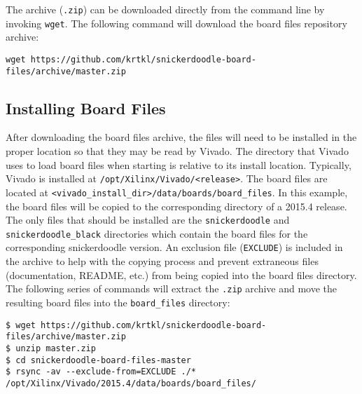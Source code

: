 \noindent
The archive (\texttt{.zip}) can be downloaded directly from the command line by invoking \texttt{wget}. The following command will download the board files repository archive:

\begin{fullwidth}
\begin{lstlisting}[style=text]
wget https://github.com/krtkl/snickerdoodle-board-files/archive/master.zip
\end{lstlisting}
\end{fullwidth}


\subsection{Installing Board Files}


After downloading the board files archive, the files will need to be installed in the proper location so that they may be read by Vivado. The directory that Vivado uses to load board files when starting is relative to its install location. Typically, Vivado is installed at \texttt{/opt/Xilinx/Vivado/<release>}. The board files are located at \texttt{<vivado\_install\_dir>/data/boards/board\_files}. In this example, the board files will be copied to the corresponding directory of a 2015.4 release. \\

\noindent
The only files that should be installed are the \texttt{snickerdoodle} and \texttt{snickerdoodle\_black} directories which contain the board files for the corresponding snickerdoodle version. An exclusion file (\texttt{EXCLUDE}) is included in the archive to help with the copying process and prevent extraneous files (documentation, README, etc.) from being copied into the board files directory. \\

\noindent
The following series of commands will extract the \texttt{.zip} archive and move the resulting board files into the \texttt{board\_files} directory: \\

\begin{fullwidth}
\begin{lstlisting}[style=text]
$ wget https://github.com/krtkl/snickerdoodle-board-files/archive/master.zip
$ unzip master.zip
$ cd snickerdoodle-board-files-master
$ rsync -av --exclude-from=EXCLUDE ./* /opt/Xilinx/Vivado/2015.4/data/boards/board_files/
\end{lstlisting}
\end{fullwidth}

